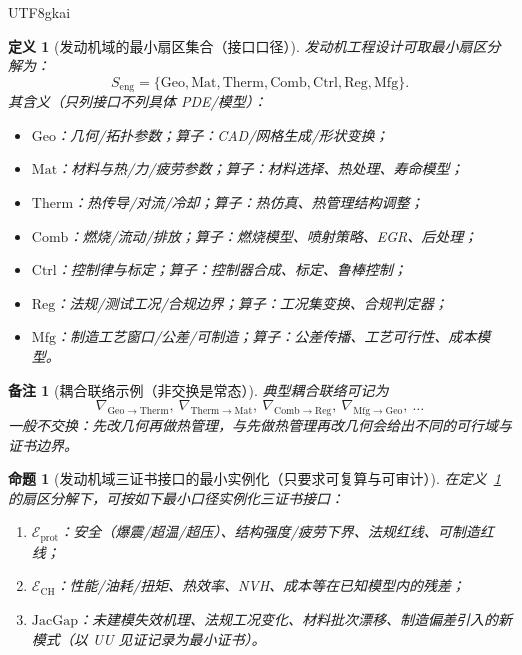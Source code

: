 \documentclass[12pt]{article}
\newtheorem{definition}{定义}[section]
\newtheorem{proposition}{命题}[section]
\newtheorem{remark}{备注}[section]
\newcommand{\JacGap}{\ensuremath{\mathrm{JacGap}}} %
\begin{document}
\begin{CJK*}{UTF8}{gkai}
\begin{definition}[发动机域的最小扇区集合（接口口径）]
\label{def:eng-minimal-engine-sectors}
发动机工程设计可取最小扇区分解为：
\[
  S_{\mathrm{eng}}=
  \{\mathrm{Geo},\mathrm{Mat},\mathrm{Therm},\mathrm{Comb},\mathrm{Ctrl},\mathrm{Reg},\mathrm{Mfg}\}.
\]
其含义（只列接口不列具体 PDE/模型）：
\begin{itemize}
  \item $\mathrm{Geo}$：几何/拓扑参数；算子：CAD/网格生成/形状变换；
  \item $\mathrm{Mat}$：材料与热/力/疲劳参数；算子：材料选择、热处理、寿命模型；
  \item $\mathrm{Therm}$：热传导/对流/冷却；算子：热仿真、热管理结构调整；
  \item $\mathrm{Comb}$：燃烧/流动/排放；算子：燃烧模型、喷射策略、EGR、后处理；
  \item $\mathrm{Ctrl}$：控制律与标定；算子：控制器合成、标定、鲁棒控制；
  \item $\mathrm{Reg}$：法规/测试工况/合规边界；算子：工况集变换、合规判定器；
  \item $\mathrm{Mfg}$：制造工艺窗口/公差/可制造；算子：公差传播、工艺可行性、成本模型。
\end{itemize}
\end{definition}

\begin{remark}[耦合联络示例（非交换是常态）]
典型耦合联络可记为
\[
  \nabla_{\mathrm{Geo}\to \mathrm{Therm}},\
  \nabla_{\mathrm{Therm}\to \mathrm{Mat}},\
  \nabla_{\mathrm{Comb}\to \mathrm{Reg}},\
  \nabla_{\mathrm{Mfg}\to \mathrm{Geo}},\ \dots
\]
一般不交换：先改几何再做热管理，与先做热管理再改几何会给出不同的可行域与证书边界。
\end{remark}

\begin{proposition}[发动机域三证书接口的最小实例化（只要求可复算与可审计）]
\label{prop:eng-minimal-engine-cert-instances}
在定义~\ref{def:eng-minimal-engine-sectors} 的扇区分解下，可按如下最小口径实例化三证书接口：
\begin{enumerate}
  \item $\mathcal{E}_{\mathrm{prot}}$：安全（爆震/超温/超压）、结构强度/疲劳下界、法规红线、可制造红线；
  \item $\mathcal{E}_{\mathrm{CH}}$：性能/油耗/扭矩、热效率、NVH、成本等在已知模型内的残差；
  \item $\JacGap$：未建模失效机理、法规工况变化、材料批次漂移、制造偏差引入的新模式（以 UU 见证记录为最小证书）。
\end{enumerate}
\end{proposition}


\end{CJK*}
\end{document}
